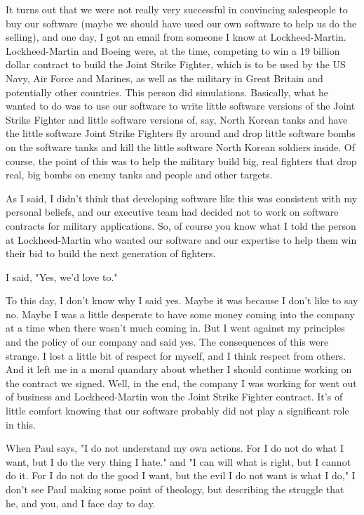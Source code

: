 \documentclass[11pt]{article}
\begin{document}
It turns out that we were not really very successful in convincing
salespeople to buy our software (maybe we should have used our own
software to help us do the selling), and one day, I got an email
from someone I know at Lockheed-Martin. Lockheed-Martin and Boeing
were, at the time, competing to win a 19 billion dollar contract
to build the Joint Strike Fighter, which is to be used by the US
Navy, Air Force and Marines, as well as the military in Great
Britain and potentially other countries. This person did
simulations. Basically, what he wanted to do was to use our
software to write little software versions of the Joint Strike
Fighter and little software versions of, say, North Korean tanks
and have the little software Joint Strike Fighters fly around and
drop little software bombs on the software tanks and kill the
little software North Korean soldiers inside. Of course, the point
of this was to help the military build big, real fighters that
drop real, big bombs on enemy tanks and people and other targets.

As I said, I didn't think that developing software like this was
consistent with my personal beliefs, and our executive team had
decided not to work on  software contracts for military
applications. So, of course you know what I told the person at
Lockheed-Martin who wanted our software and our expertise to help
them win their bid to build the next generation of fighters.

I said, "Yes, we'd love to."

To this day, I don't know why I said yes. Maybe it was because I
don't like to say no. Maybe I was a little desperate to have some
money coming into the company at a time when there wasn't much
coming in. But I went against my principles and the policy of our
company and said yes. The consequences of this were strange. I
lost a little bit of respect for myself, and I think respect from
others. And it left me in a moral quandary about whether I should
continue working on the contract we signed.  Well, in the end, the
company I was working for went out of business and Lockheed-Martin
won the Joint Strike Fighter contract. It's of little comfort
knowing that our software probably did not play a significant role
in this.

When Paul says,  "I do not understand my own actions. For I do not
do what I want, but I do the very thing I hate." and "I can will
what is right, but I cannot do it. For I do not do the good I
want, but the evil I do not want is what I do," I don't see Paul
making some point of theology, but describing the struggle that
he, and you, and I face day to day.
\end{document}
